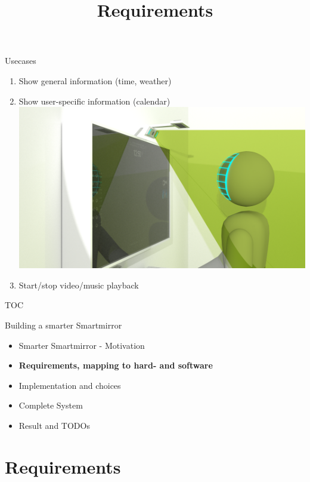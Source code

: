 \documentclass[xcolor=svgnames,handout,aspectratio=169]{beamer}
\begin{document}
\begin{frame}
	{Usecases}
	\begin{enumerate}
		\item Show general information (time, weather)
		\item Show user-specific information (calendar)
			\includegraphics[width=0.5\linewidth]{images/facerecog.png}\\
		\item Start/stop video/music playback
	\end{enumerate}
\end{frame}

\begin{frame}
  {TOC}

  Building a smarter Smartmirror

  \begin{itemize}
  \item Smarter Smartmirror - Motivation
  \item \textbf{Requirements, mapping to hard- and software}
  \item Implementation and choices
  \item Complete System
  \item Result and TODOs  
  \end{itemize}
\end{frame}

\section{Requirements}
\title[Requirements]{Requirements}
\end{document}
